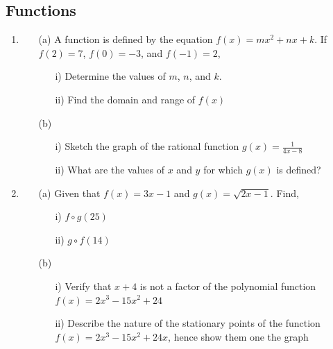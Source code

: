 \subsection{Functions}

\begin{enumerate}
	\item 
	\begin{enumerate}[topsep=0ex,itemsep=0ex,partopsep=1ex,parsep=1ex]
		\item[(a)] A function is defined by the equation $f(x) = mx^2 + nx + k$. If $f(2) = 7$, $f(0) = -3$, and $f(-1) = 2$, 
		\begin{enumerate}[topsep=0ex,itemsep=0ex,partopsep=1ex,parsep=1ex]
			\item[i)] Determine the values of $m$, $n$, and $k$. 
			\item[ii)] Find the domain and range of $f(x)$
		\end{enumerate}
		
		\item[(b)] 
		\begin{enumerate}[topsep=0ex,itemsep=0ex,partopsep=1ex,parsep=1ex]
			\item[i)] Sketch the graph of the rational function $g(x) = \frac{1}{4x - 8}$
			\item[ii)] What are the values of $x$ and $y$ for which $g(x)$ is defined?
		\end{enumerate}
	\end{enumerate}

	\item
	\begin{enumerate}[topsep=0ex,itemsep=0ex,partopsep=1ex,parsep=1ex]
		\item[(a)] Given that $f(x) = 3x - 1$ and $g(x) = \sqrt{2x - 1}$. Find, 
		\begin{enumerate}[topsep=0ex,itemsep=0ex,partopsep=1ex,parsep=1ex]
			\item[i)] $f \circ g(25)$ 
			\item[ii)] $g \circ f(14)$
		\end{enumerate}
		
		\item[(b)] 
		\begin{enumerate}[topsep=0ex,itemsep=0ex,partopsep=1ex,parsep=1ex]
			\item[i)] Verify that $x + 4$ is not a factor of the polynomial function $f(x) = 2x^3 - 15x^2 + 24$
			\item[ii)] Describe the nature of the stationary points of the function $f(x) = 2x^3 - 15x^2 + 24x$, hence show them one the graph
		\end{enumerate}
	\end{enumerate}
	

\end{enumerate}
